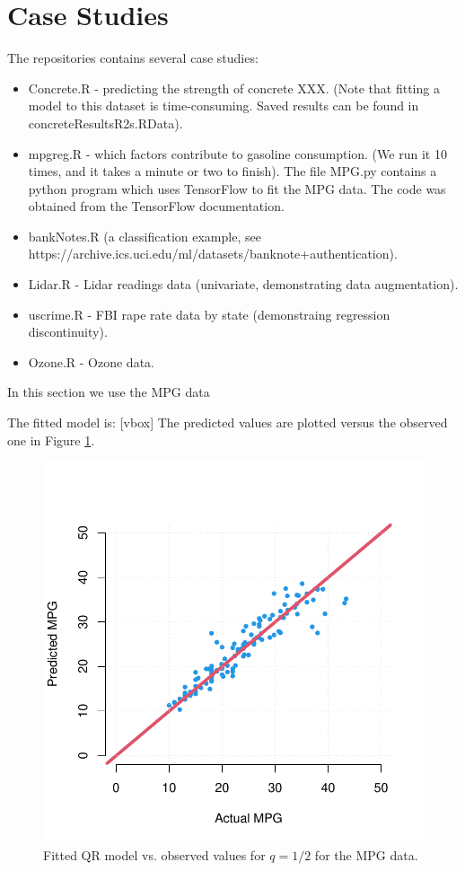 \documentclass[a4paper,12pt]{article}
\begin{document}
\section{Case Studies}
The repositories contains several case studies:
\begin{itemize}
 \item Concrete.R - predicting the strength of concrete XXX. (Note that fitting a model to this dataset is time-consuming. Saved results can be found in concreteResultsR2s.RData).
 \item mpgreg.R - which factors contribute to gasoline consumption. (We run it 10 times, and it takes a minute or two to finish). The file MPG.py contains a python program which uses TensorFlow to fit the MPG data. The code was obtained from the TensorFlow documentation.
 \item bankNotes.R (a classification example, see https://archive.ics.uci.edu/ml/datasets/banknote+authentication).
 \item Lidar.R - Lidar readings data (univariate, demonstrating data augmentation).
 \item uscrime.R - FBI rape rate data by state (demonstraing regression discontinuity).
 \item Ozone.R - Ozone data.
\end{itemize}

In this section we use the MPG data

The fitted model is: [vbox]
\noindent The predicted values are plotted versus the observed one in Figure \ref{mpgplot}.

\begin{figure}[b!]
\centering
\includegraphics[width=.6\linewidth]{Figures/mpg.pdf}
\caption{Fitted QR model vs. observed values for $q=1/2$ for the MPG data.}\label{mpgplot}
\end{figure} 
\end{document}
